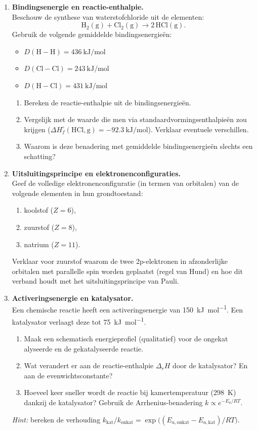 \begin{enumerate}
\item \textbf{Bindingsenergie en reactie-enthalpie.} \\
Beschouw de synthese van waterstofchloride uit de elementen:
\[
\mathrm{H_2(g) + Cl_2(g) \rightarrow 2\,HCl(g)}.
\]
Gebruik de volgende gemiddelde bindingsenergie\"en:
\begin{itemize}
\item $D(\mathrm{H{-}H}) = \SI{436}{\kilo\joule\per\mole}$
\item $D(\mathrm{Cl{-}Cl}) = \SI{243}{\kilo\joule\per\mole}$
\item $D(\mathrm{H{-}Cl}) = \SI{431}{\kilo\joule\per\mole}$
\end{itemize}
\begin{enumerate}
\item[(a)] Bereken de reactie-enthalpie uit de bindingsenergie\"en.
\item[(b)] Vergelijk met de waarde die men via standaardvormingsenthalpie\"en zou krijgen ($\Delta H_f^\circ(\mathrm{HCl,g}) = \SI{-92.3}{\kilo\joule\per\mole}$). Verklaar eventuele verschillen.
\item[(c)] Waarom is deze benadering met gemiddelde bindingsenergie\"en slechts een schatting?
\end{enumerate}

\item \textbf{Uitsluitingsprincipe en elektronenconfiguraties.} \\
Geef de volledige elektronenconfiguratie (in termen van orbitalen) van de volgende elementen in hun grondtoestand:
\begin{enumerate}
\item[(a)] koolstof ($Z=6$),
\item[(b)] zuurstof ($Z=8$),
\item[(c)] natrium ($Z=11$).
\end{enumerate}
Verklaar voor zuurstof waarom de twee 2p-elektronen in afzonderlijke orbitalen met parallelle spin worden geplaatst (regel van Hund) en hoe dit verband houdt met het uitsluitingsprincipe van Pauli.

\item \textbf{Activeringsenergie en katalysator.} \\
Een chemische reactie heeft een activeringsenergie van \SI{150}{\kilo\joule\per\mole}. Een katalysator verlaagt deze tot \SI{75}{\kilo\joule\per\mole}.
\begin{enumerate}
\item[(a)] Maak een schematisch energieprofiel (qualitatief) voor de ongekat \-alyseerde en de gekatalyseerde reactie.
\item[(b)] Wat verandert er aan de reactie-enthalpie $\Delta_r H$ door de katalysator? En aan de evenwichtsconstante?
\item[(c)] Hoeveel keer sneller wordt de reactie bij kamertemperatuur (\SI{298}{\kelvin}) dankzij de katalysator? Gebruik de Arrhenius-benadering $k \propto e^{-E_a/RT}$.
\end{enumerate}
\emph{Hint:} bereken de verhouding $k_{\text{kat}}/k_{\text{onkat}} = \exp\!\bigl((E_{a,\text{onkat}} - E_{a,\text{kat}})/RT\bigr)$.


\end{enumerate}
